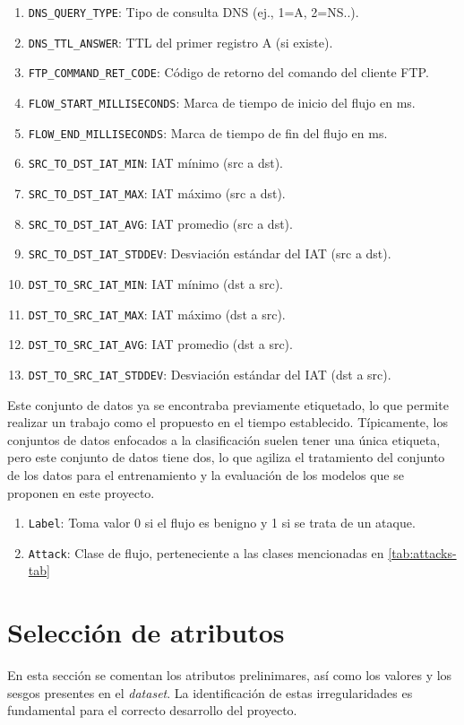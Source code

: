 \begin{enumerate}
    \item \texttt{DNS\_QUERY\_TYPE}: Tipo de consulta DNS (ej., 1=A, 2=NS..).
    \item \texttt{DNS\_TTL\_ANSWER}: TTL del primer registro A (si existe).
    \item \texttt{FTP\_COMMAND\_RET\_CODE}: Código de retorno del comando del cliente FTP.
    \item \texttt{FLOW\_START\_MILLISECONDS}: Marca de tiempo de inicio del flujo en ms.
    \item \texttt{FLOW\_END\_MILLISECONDS}: Marca de tiempo de fin del flujo en ms.
    \item \texttt{SRC\_TO\_DST\_IAT\_MIN}: IAT mínimo (src a dst).
    \item \texttt{SRC\_TO\_DST\_IAT\_MAX}: IAT máximo (src a dst).
    \item \texttt{SRC\_TO\_DST\_IAT\_AVG}: IAT promedio (src a dst).
    \item \texttt{SRC\_TO\_DST\_IAT\_STDDEV}: Desviación estándar del IAT (src a dst).
    \item \texttt{DST\_TO\_SRC\_IAT\_MIN}: IAT mínimo (dst a src).
    \item \texttt{DST\_TO\_SRC\_IAT\_MAX}: IAT máximo (dst a src).
    \item \texttt{DST\_TO\_SRC\_IAT\_AVG}: IAT promedio (dst a src).
    \item \texttt{DST\_TO\_SRC\_IAT\_STDDEV}: Desviación estándar del IAT (dst a src).
\end{enumerate}

Este conjunto de datos ya se encontraba previamente etiquetado, lo que permite realizar un trabajo como el propuesto en el tiempo establecido. Típicamente, los conjuntos de datos enfocados a la clasificación suelen tener una única etiqueta, pero este conjunto de datos tiene dos, lo que agiliza el tratamiento del conjunto de los datos para el entrenamiento y la evaluación de los modelos que se proponen en este proyecto.

\begin{enumerate}
    \item \texttt{Label}: Toma valor 0 si el flujo es benigno y 1 si se trata de un ataque.
    \item \texttt{Attack}: Clase de flujo, perteneciente a las clases mencionadas en \ref{tab:attacks-tab} 
\end{enumerate}

\section{Selección de atributos}\label{sec:selectdatos}
En esta sección se comentan los atributos prelinimares, así como los valores y los sesgos presentes en el \textit{dataset}. La identificación de estas irregularidades es fundamental para el correcto desarrollo del proyecto.

